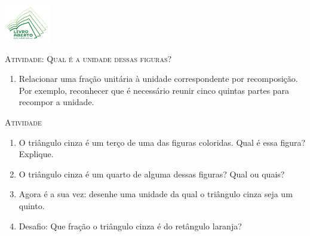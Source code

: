 \documentclass[10 pt,usenames,dvipsnames, oneside]{article}
\begin{document}
\begin{center}
  \begin{minipage}[l]{3cm}
\includegraphics[width=2cm]{logo}    
\end{minipage}\hfill
\begin{minipage}[r]{.8\textwidth}
 {\Large \scshape Atividade: Qual é a unidade dessas figuras?}  
\end{minipage}
\end{center}
\vspace{.2cm}

\ifdefined\prof
\begin{goals}
\begin{enumerate}

\item Relacionar uma fração unitária à unidade correspondente por recomposição. Por exemplo, reconhecer que é necessário reunir cinco quintas partes para recompor a unidade.

\end{enumerate}
\end{goals}

\bigskip
\begin{center}
{\large \scshape Atividade}
\end{center}
\fi


\begin{enumerate}[label=\alph*)]
\item O triângulo cinza é um terço de uma das figuras coloridas. Qual é essa figura? Explique. 
\item O triângulo cinza é um quarto de alguma dessas figuras? Qual ou quais?
\item Agora é a sua vez: desenhe uma unidade da qual o triângulo cinza seja um quinto.  
\item Desafio: Que fração o triângulo cinza é do retângulo laranja? 
\end{enumerate}
\end{document}

